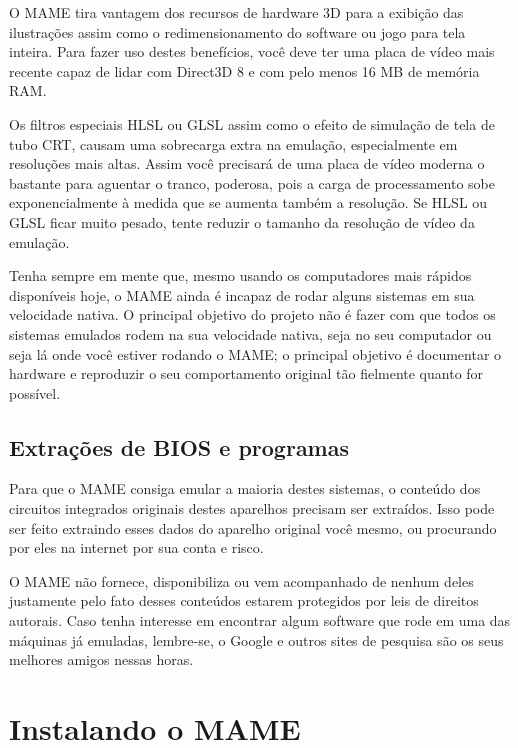 \documentclass[letterpaper,10pt,brazil]{sphinxmanual}
\begin{document}
O MAME tira vantagem dos recursos de hardware 3D para a exibição das
ilustrações assim como o redimensionamento do software ou jogo para tela
inteira. Para fazer uso destes benefícios, você deve ter uma placa de
vídeo mais recente capaz de lidar com Direct3D 8 e com pelo menos 16 MB
de memória RAM.

Os filtros especiais HLSL ou GLSL assim como o efeito de simulação de
tela de tubo CRT, causam uma sobrecarga extra na emulação, especialmente
em resoluções mais altas. Assim você precisará de uma placa de vídeo
moderna o bastante para aguentar o tranco, poderosa, pois a carga de
processamento sobe exponencialmente à medida que se aumenta também a
resolução. Se HLSL ou GLSL ficar muito pesado, tente reduzir o tamanho
da resolução de vídeo da emulação.

Tenha sempre em mente que, mesmo usando os computadores mais rápidos
disponíveis hoje, o MAME ainda é incapaz de rodar alguns sistemas em
sua velocidade nativa. O principal objetivo do projeto não é fazer com
que todos os sistemas emulados rodem na sua velocidade nativa, seja no
seu computador ou seja lá onde você estiver rodando o MAME; o principal
objetivo é documentar o hardware e reproduzir o seu comportamento
original tão fielmente quanto for possível.


\subsection{Extrações de BIOS e programas}
\label{initialsetup/mameintro:extracoes-de-bios-e-programas}
Para que o MAME consiga emular a maioria destes sistemas, o conteúdo dos
circuitos integrados originais destes aparelhos precisam ser extraídos.
Isso pode ser feito extraindo esses dados do aparelho original você
mesmo, ou procurando por eles na internet por sua conta e risco.

O MAME não fornece, disponibiliza ou vem acompanhado de nenhum deles
justamente pelo fato desses conteúdos estarem protegidos por leis de
direitos autorais. Caso tenha interesse em encontrar algum software que
rode em uma das máquinas já emuladas, lembre-se, o Google e outros sites
de pesquisa são os seus melhores amigos nessas horas.


\section{Instalando o MAME}
\label{initialsetup/installingmame:instalando-o-mame}\label{initialsetup/installingmame::doc}
\end{document}
